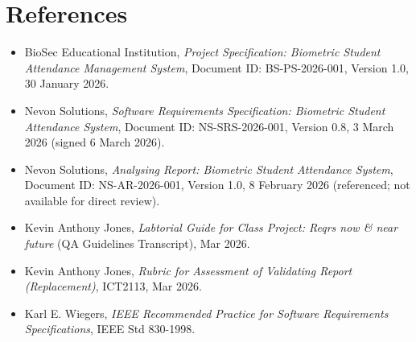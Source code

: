 \documentclass[11pt,a4paper]{article}
\begin{document}
\section*{References}
\begin{itemize}[leftmargin=*,nosep]
\item BioSec Educational Institution, \textit{Project Specification: Biometric Student Attendance Management System}, Document ID: BS-PS-2026-001, Version 1.0, 30 January 2026.
\item Nevon Solutions, \textit{Software Requirements Specification: Biometric Student Attendance System}, Document ID: NS-SRS-2026-001, Version 0.8, 3 March 2026 (signed 6 March 2026).
\item Nevon Solutions, \textit{Analysing Report: Biometric Student Attendance System}, Document ID: NS-AR-2026-001, Version 1.0, 8 February 2026 (referenced; not available for direct review).
\item Kevin Anthony Jones, \textit{Labtorial Guide for Class Project: Reqrs now \& near future} (QA Guidelines Transcript), Mar 2026.
\item Kevin Anthony Jones, \textit{Rubric for Assessment of Validating Report (Replacement)}, ICT2113, Mar 2026.
\item Karl E. Wiegers, \textit{IEEE Recommended Practice for Software Requirements Specifications}, IEEE Std 830-1998.
\end{itemize}
\end{document}
